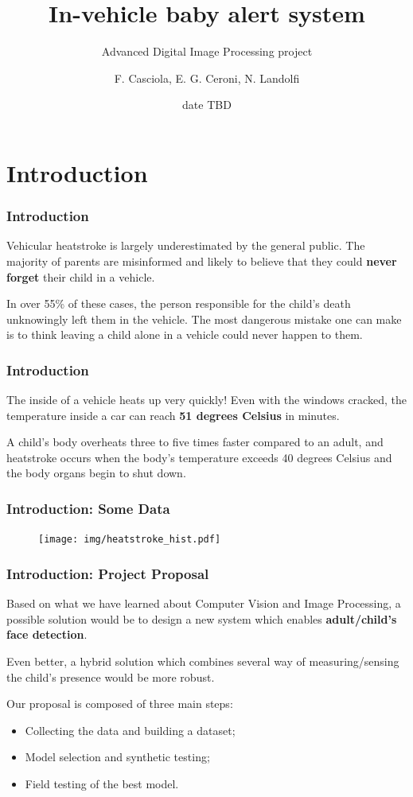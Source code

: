 \documentclass{beamer}
\title{In-vehicle baby alert system}
\subtitle{Advanced Digital Image Processing project}
\author{F. Casciola, E. G. Ceroni, N. Landolfi} %
\institute[Unisi]{Università degli Studi di Siena}
\date{date TBD}
\begin{document}
	
	\frame{\titlepage}
	
	\section{Introduction}
	
	\begin{frame}
		\frametitle{Introduction}
		Vehicular heatstroke is largely underestimated by the general public. The majority of parents are misinformed and likely to believe that they could \textbf{never forget} their child in a vehicle.
		
		\bigskip
		
		In over 55\% of these cases, the person responsible for the child’s death unknowingly left them in the vehicle. The most dangerous mistake one can make is to think leaving a child alone in a vehicle could never happen to them.
	\end{frame}

	\begin{frame}
		\frametitle{Introduction}
		The inside of a vehicle heats up very quickly! Even with the windows cracked, the temperature inside a car can reach \textbf{51 degrees Celsius} in minutes.
		
		\bigskip
				
		A child's  body overheats three to five times faster compared to an adult, and heatstroke occurs when the body's temperature exceeds 40 degrees Celsius and the body organs begin to shut down.
	\end{frame}

	\begin{frame}
		\frametitle{Introduction: Some Data}
		\begin{figure}
			\centering
			\texttt{[image: img/heatstroke\_hist.pdf]}
			\label{fig:heatstroke_hist}
		\end{figure}		
	\end{frame}

	\begin{frame}
		\frametitle{Introduction: Project Proposal}
		Based on what we have learned about Computer Vision and Image Processing, a possible solution would be to design a new system which enables \textbf{adult/child's face detection}.
		
		Even better, a hybrid solution which combines several way of measuring/sensing the child's presence would be more robust.
		
		\bigskip
		
		Our proposal is composed of three main steps:
		\begin{itemize}
			\item Collecting the data and building a dataset;
			\item Model selection and synthetic testing;
			\item Field testing of the best model.
		\end{itemize}
	\end{frame}
	
\end{document}
